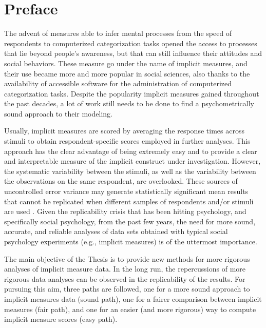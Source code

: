 \documentclass[12pt]{book}
\begin{document}
\chapter{Preface} \label{chap:preface}

The advent of measures able to infer mental processes from the speed of respondents to computerized categorization tasks opened the access to  processes that lie beyond people's awareness, but that can still influence their attitudes and social behaviors. 
These measure go under the name of implicit measures, and their use became more and more popular in social sciences, also thanks to the availability of accessible software for the administration of computerized categorization tasks.
Despite the popularity implicit measures gained throughout the past decades, a lot of work still needs to be done to find a psychometrically sound approach to their modeling.


Usually, implicit measures are scored by averaging the response times across stimuli to obtain respondent-specific scores employed in further analyses. 
This approach has the clear advantage of being extremely easy and to provide a clear and interpretable measure of the implicit construct under investigation.  
However, the systematic variability between the stimuli, as well as the variability between the observations on the same respondent, are overlooked. 
These sources of uncontrolled error variance may generate statistically significant mean results that cannot be replicated when different samples of respondents and/or stimuli are used \cite{judd2012}. 
Given the replicability crisis that has been hitting psychology, and specifically social psychology, from the past few years, the need for more sound, accurate, and reliable analyses of data sets obtained with typical social psychology experiments (e.g., implicit measures) is of the uttermost importance. 

The main objective of the Thesis is to provide new methods for more rigorous analyses of implicit measure data. 
In the long run, the repercussions of more rigorous data analyses can be observed in the replicability of the results.
For pursuing this aim, three paths are followed, one for a more sound approach to implicit measures data (sound path), one for a fairer comparison between implicit measures (fair path), and one for an easier (and more rigorous) way to compute implicit measure scores (easy path).
\end{document}
